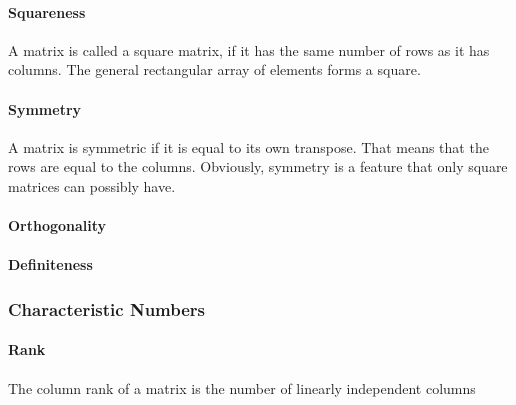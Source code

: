 \paragraph{Squareness}
A matrix is called a square matrix, if it has the same number of rows as it has columns. The general rectangular array of elements forms a square.

\paragraph{Symmetry}
A matrix is symmetric if it is equal to its own transpose. That means that the rows are equal to the columns. Obviously, symmetry is a feature that only square matrices can possibly have.

\paragraph{Orthogonality}

\paragraph{Definiteness}

%





\subsubsection{Characteristic Numbers}

\paragraph{Rank}
The column rank of a matrix is the number of linearly independent columns

